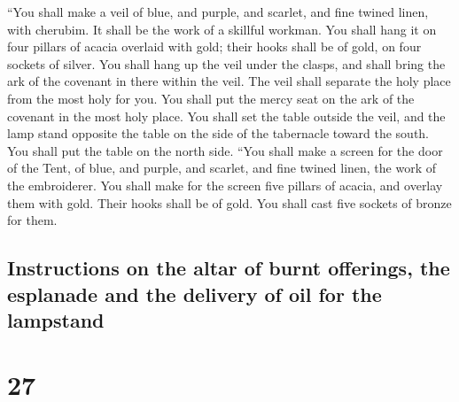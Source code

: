  ``You shall make a veil of blue, and purple, and
scarlet, and fine twined linen, with cherubim. It shall be the work of a
skillful workman.  You shall hang it on four pillars of
acacia overlaid with gold; their hooks shall be of gold, on four sockets
of silver.  You shall hang up the veil under the clasps,
and shall bring the ark of the covenant in there within the veil. The
veil shall separate the holy place from the most holy for you.
 You shall put the mercy seat on the ark of the covenant
in the most holy place.  You shall set the table outside
the veil, and the lamp stand opposite the table on the side of the
tabernacle toward the south. You shall put the table on the north side.
 ``You shall make a screen for the door of the Tent, of
blue, and purple, and scarlet, and fine twined linen, the work of the
embroiderer.  You shall make for the screen five pillars
of acacia, and overlay them with gold. Their hooks shall be of gold. You
shall cast five sockets of bronze for them.

\hypertarget{instructions-on-the-altar-of-burnt-offerings-the-esplanade-and-the-delivery-of-oil-for-the-lampstand}{%
\subsection{Instructions on the altar of burnt offerings, the esplanade
and the delivery of oil for the
lampstand}\label{instructions-on-the-altar-of-burnt-offerings-the-esplanade-and-the-delivery-of-oil-for-the-lampstand}}

\hypertarget{section-26}{%
\section{27}\label{section-26}}

